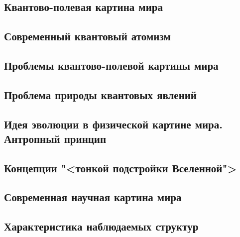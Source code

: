 \documentclass[main.tex]{subfiles}
\begin{document}
\subsection{Квантово-полевая картина мира}


\subsection{Современный квантовый атомизм}



\subsection{Проблемы квантово-полевой картины мира}


\subsection{Проблема природы квантовых явлений}


\subsection{Идея эволюции в физической картине мира. Антропный принцип}


\subsection{Концепции "<тонкой подстройки Вселенной">}


\subsection{Современная научная картина мира}


\subsection{Характеристика наблюдаемых структур}

\end{document}
